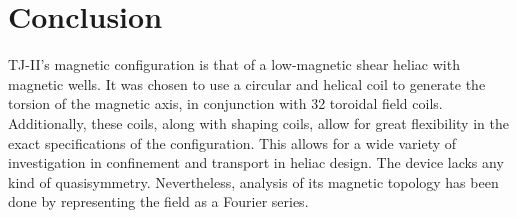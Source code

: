 \documentclass[a4paper]{article}
\begin{document}

\section*{Conclusion}
TJ-II's magnetic configuration is that of a low-magnetic shear heliac with magnetic wells.
It was chosen to use a circular and helical coil to generate the torsion of the magnetic axis, in conjunction with 32 toroidal field coils.
Additionally, these coils, along with shaping coils, allow for great flexibility in the exact specifications of the configuration.
This allows for a wide variety of investigation in confinement and transport in heliac design.
The device lacks any kind of quasisymmetry. Nevertheless, analysis of its magnetic topology has been done by representing the field as a Fourier series.



\nocite{*}

\end{document}
